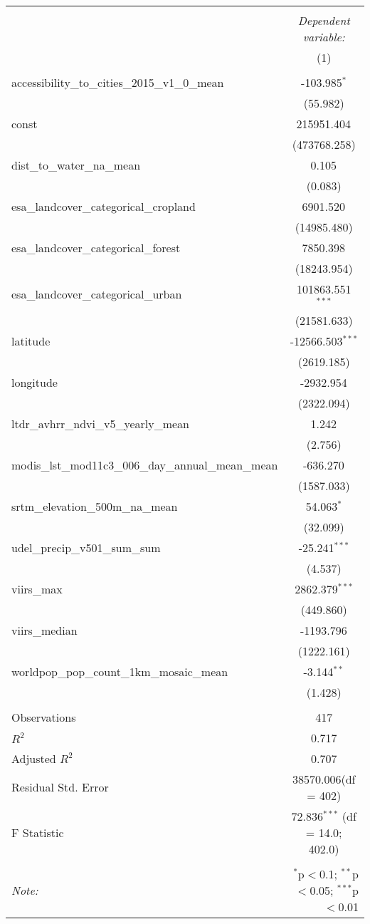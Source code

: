 \begin{table}[!htbp] \centering
\begin{tabular}{@{\extracolsep{5pt}}lc}
\\[-1.8ex]\hline
\hline \\[-1.8ex]
& \multicolumn{1}{c}{\textit{Dependent variable:}} \
\cr \cline{1-2}
\\[-1.8ex] & (1) \\
\hline \\[-1.8ex]
 accessibility_to_cities_2015_v1_0_mean & -103.985$^{*}$ \\
  & (55.982) \\
 const & 215951.404$^{}$ \\
  & (473768.258) \\
 dist_to_water_na_mean & 0.105$^{}$ \\
  & (0.083) \\
 esa_landcover_categorical_cropland & 6901.520$^{}$ \\
  & (14985.480) \\
 esa_landcover_categorical_forest & 7850.398$^{}$ \\
  & (18243.954) \\
 esa_landcover_categorical_urban & 101863.551$^{***}$ \\
  & (21581.633) \\
 latitude & -12566.503$^{***}$ \\
  & (2619.185) \\
 longitude & -2932.954$^{}$ \\
  & (2322.094) \\
 ltdr_avhrr_ndvi_v5_yearly_mean & 1.242$^{}$ \\
  & (2.756) \\
 modis_lst_mod11c3_006_day_annual_mean_mean & -636.270$^{}$ \\
  & (1587.033) \\
 srtm_elevation_500m_na_mean & 54.063$^{*}$ \\
  & (32.099) \\
 udel_precip_v501_sum_sum & -25.241$^{***}$ \\
  & (4.537) \\
 viirs_max & 2862.379$^{***}$ \\
  & (449.860) \\
 viirs_median & -1193.796$^{}$ \\
  & (1222.161) \\
 worldpop_pop_count_1km_mosaic_mean & -3.144$^{**}$ \\
  & (1.428) \\
\hline \\[-1.8ex]
 Observations & 417 \\
 $R^2$ & 0.717 \\
 Adjusted $R^2$ & 0.707 \\
 Residual Std. Error & 38570.006(df = 402)  \\
 F Statistic & 72.836$^{***}$ (df = 14.0; 402.0) \\
\hline
\hline \\[-1.8ex]
\textit{Note:} & \multicolumn{1}{r}{$^{*}$p$<$0.1; $^{**}$p$<$0.05; $^{***}$p$<$0.01} \\
\end{tabular}
\end{table}